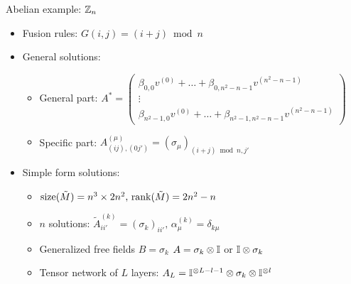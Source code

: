 \documentclass{fdubeamer}
\begin{document}
\begin{frame}{Abelian example: \texorpdfstring{$\mathbb{Z}_n$}{ℤₙ}}

\linespread{1.4}
\selectfont

\begin{itemize}
  \item Fusion rules: $G(i,j) = (i+j)\bmod n$
  \item General solutions:

    \begin{itemize}
      \item General part:
        $
          A^* = \left( \begin{smallmatrix}
            \beta_{0,0} v^{(0)} + \dots + \beta_{0,n^2-n-1} v^{(n^2-n-1)} \\[0.5ex]
            \vdots \\
            \beta_{n^2-1,0} v^{(0)} + \dots + \beta_{n^2-1,n^2-n-1} v^{(n^2-n-1)}
          \end{smallmatrix} \right)
        $
      \item Specific part: $A^{(\mu)}_{(ij), (0j')} = (\sigma_\mu)_{(i+j)\bmod n, j'}$
    \end{itemize}

  \item Simple form solutions:

    \begin{itemize}
      \item $\operatorname{size}(\tilde{M})=n^3\times2n^2, \, \operatorname{rank}(\tilde{M})=2n^2-n$
      \item $n$ solutions: $\tilde{A}^{(k)}_{ii'} = (\sigma_k)_{ii'}, \, \alpha^{(k)}_\mu = \delta_{k\mu}$
      \item Generalized free fields $B=\sigma_k$ \textrightarrow{} $A=\sigma_k\otimes\mathbb{I}$ or $\mathbb{I}\otimes\sigma_k$
      \item Tensor network of $L$ layers: $A_L = \mathbb{I}^{\otimes L-l-1} \otimes \sigma_k \otimes \mathbb{I}^{\otimes l}$
    \end{itemize}
\end{itemize}

\end{frame}
\end{document}
